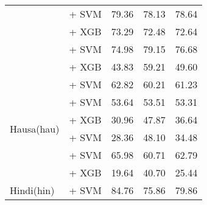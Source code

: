 \begin{longtable}{llccc}
                                          & \citep{sturua2024jinaembeddingsv3multilingualembeddingstask} + SVM     & 79.36                                & 78.13              & 78.64             \\
                                          & \citep{sturua2024jinaembeddingsv3multilingualembeddingstask} + XGB     & 73.29                                & 72.48              & 72.64             \\
                                          & \citep{romero2023multilinguale5largeftstsspanish} + SVM                & 74.98                                & 79.15              & 76.68             \\
                                          & \citep{all-MiniLM-L12-v2} + XGB                                        & 43.83                                & 59.21              & 49.60             \\
    \midrule
    \multirow{6}{*}{Hausa(hau)}           & \citep{wang2024multilingual}  + SVM                                    & 62.82                                & 60.21              & 61.23             \\
                                          & \citep{sturua2024jinaembeddingsv3multilingualembeddingstask} + SVM     & 53.64                                & 53.51              & 53.31             \\
                                          & \citep{sturua2024jinaembeddingsv3multilingualembeddingstask} + XGB     & 30.96                                & 47.87              & 36.64             \\
                                          & \citep{oketunji2024pmmlv2finetunedhausa} + SVM                         & 28.36                                & 48.10              & 34.48             \\
                                          & \citep{dobler-demelo-2023-focus} + SVM                                 & 65.98                                & 60.71              & 62.79             \\
                                          & \citep{all-MiniLM-L12-v2} + XGB                                        & 19.64                                & 40.70              & 25.44             \\
    \midrule
    \multirow{7}{*}{Hindi(hin)}           & \citep{sukhlecha_2024_bhasha_embed_v0} + SVM                           & 84.76                                & 75.86              & 79.86             \\

\end{longtable}
